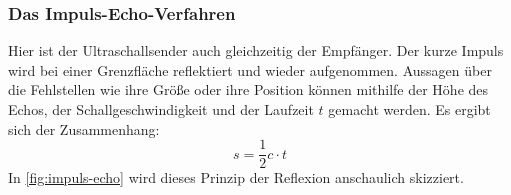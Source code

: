 \subsubsection{Das Impuls-Echo-Verfahren}
\label{subsubsec:impuls-echo}
Hier ist der Ultraschallsender auch gleichzeitig der Empfänger.
Der kurze Impuls wird bei einer Grenzfläche reflektiert und wieder aufgenommen.
Aussagen über die Fehlstellen wie ihre Größe oder ihre Position können mithilfe der Höhe des Echos, der Schallgeschwindigkeit und der Laufzeit $t$ gemacht werden.
Es ergibt sich der Zusammenhang: 
\begin{equation} \label{eqn:schallgeschw}
    s = \frac{1}{2} c \cdot t
\end{equation}
In \autoref{fig:impuls-echo} wird dieses Prinzip der Reflexion anschaulich skizziert.


